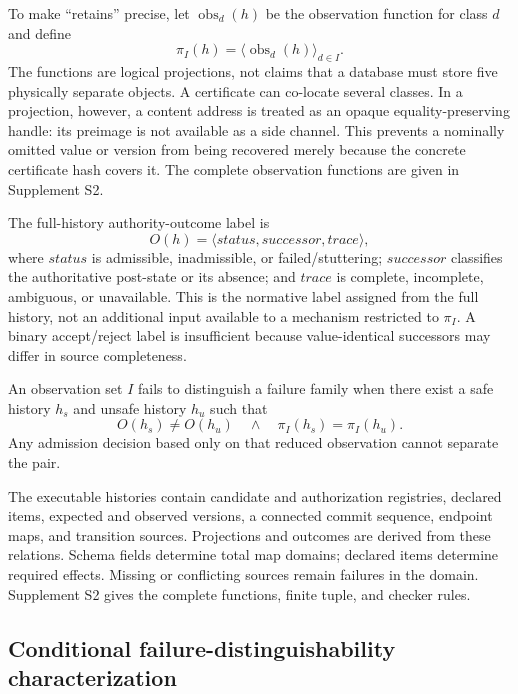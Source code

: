 To make ``retains'' precise, let $\operatorname{obs}_d(h)$ be the observation function for class $d$ and define
\begin{equation}
\pi_I(h)=\langle\operatorname{obs}_d(h)\rangle_{d\in I}.
\label{eq:observation-projection}
\end{equation}
The functions are logical projections, not claims that a database must store five physically separate objects. A certificate can co-locate several classes. In a projection, however, a content address is treated as an opaque equality-preserving handle: its preimage is not available as a side channel. This prevents a nominally omitted value or version from being recovered merely because the concrete certificate hash covers it. The complete observation functions are given in Supplement S2.

The full-history authority-outcome label is
\begin{equation}
O(h)=\langle status,successor,trace\rangle,
\label{eq:outcome}
\end{equation}
where $status$ is admissible, inadmissible, or failed/stuttering; $successor$ classifies the authoritative post-state or its absence; and $trace$ is complete, incomplete, ambiguous, or unavailable. This is the normative label assigned from the full history, not an additional input available to a mechanism restricted to $\pi_I$. A binary accept/reject label is insufficient because value-identical successors may differ in source completeness.

An observation set $I$ fails to distinguish a failure family when there exist a safe history $h_s$ and unsafe history $h_u$ such that
\begin{equation}
O(h_s)\neq O(h_u)
\quad\land\quad
\pi_I(h_s)=\pi_I(h_u).
\label{eq:indistinguishable}
\end{equation}
Any admission decision based only on that reduced observation cannot separate the pair.


The executable histories contain candidate and authorization registries, declared items, expected and observed versions, a connected commit sequence, endpoint maps, and transition sources. Projections and outcomes are derived from these relations. Schema fields determine total map domains; declared items determine required effects. Missing or conflicting sources remain failures in the domain. Supplement S2 gives the complete functions, finite tuple, and checker rules.

\subsection{Conditional failure-distinguishability characterization}

